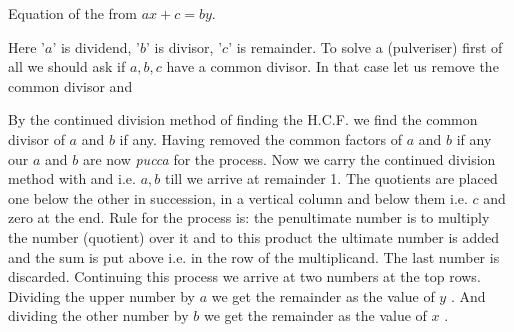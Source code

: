 \documentclass[]{article}
\begin{document}
{{Equation of the from $ax + c = by$.}

\begin{quote}  {
}  \end{quote}

{Here '$a$' is dividend, '$b$' is divisor, '$c$' is remainder. To solve a
{} (pulveriser) first of all we should ask if $a, b, c$ have a common
divisor. In that case let us remove the common divisor and}
\newpage
\large


\begin{quote}  {
}  \end{quote}

{By the continued division method of finding the H.C.F. we find the
common divisor of $a$ and $b$ if any. Having removed the common factors of $a$
and $b$ if any our $a$ and $b$ are now \textit{pucca} for the process. Now we carry the
continued division method with {} and {} i.e. $a, b$ till we
arrive at remainder 1. The quotients are placed one below the other in
succession, in a vertical column and below them {} i.e. $c$ and zero
at the end. Rule for the process is: the penultimate number is to
multiply the number (quotient) over it and to this product the ultimate
number is added and the sum is put above i.e. in the row of the
multiplicand. The last number is discarded. Continuing this process we
arrive at two numbers at the top rows. Dividing the upper number by $a$ we
get the remainder as the value of $y$ {}. And dividing the other
number by $b$ we get the remainder as the value of $x$ {}.}

}
\end{document}
